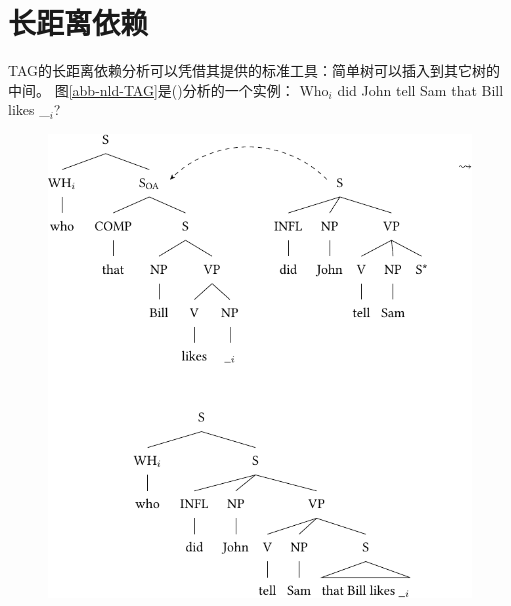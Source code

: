 \section{长距离依赖}
\label{TAG-Fernabh}

TAG的长距离依赖分析可以凭借其提供的标准工具：简单树可以插入到其它树的中间。
图\vref{abb-nld-TAG}是()分析的一个实例：
\ea
Who$_i$ did John tell Sam that Bill likes \_$_i$?
\z
%
\begin{figure}
\includegraphics{Figures/tag-long-distance-dependencies-crop}

\end{figure}

